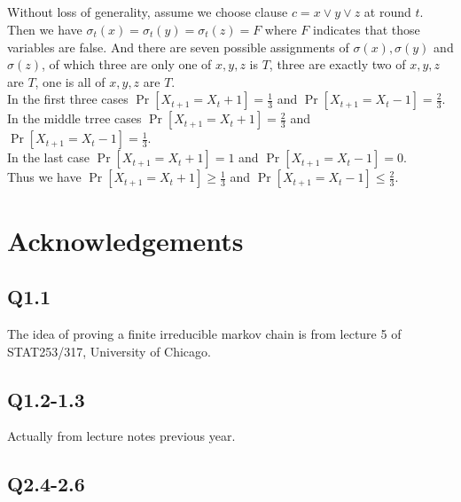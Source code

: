 \documentclass[12pt,letterpaper]{article}
\begin{document}
\subsection{}
Without loss of generality, assume we choose clause $c=x\vee y\vee z$ at round $t$.
Then we have $\sigma_t(x)=\sigma_t(y)=\sigma_t(z)=F$ where $F$ indicates that those variables are false.
And there are seven possible assignments of $\sigma(x),\sigma(y)$ and $\sigma(z)$,
of which three are only one of $x,y,z$ is $T$,
three are exactly two of $x,y,z$ are $T$,
one is all of $x,y,z$ are $T$.\\
In the first three cases $\Pr\left[X_{t+1}=X_{t}+1\right]=\frac{1}{3}$ and $\Pr\left[X_{t+1}=X_{t}-1\right]=\frac{2}{3}$.\\
In the middle trree cases  $\Pr\left[X_{t+1}=X_{t}+1\right]=\frac{2}{3}$ and $\Pr\left[X_{t+1}=X_{t}-1\right]=\frac{1}{3}$.\\
In the last case $\Pr\left[X_{t+1}=X_{t}+1\right]=1$ and $\Pr\left[X_{t+1}=X_{t}-1\right]=0$.\\
Thus we have $\Pr\left[X_{t+1}=X_{t}+1\right]\geq \frac{1}{3}$ and $\Pr\left[X_{t+1}=X_{t}-1\right]\leq\frac{2}{3}$.\\
\newpage
\section{Acknowledgements}
\subsection*{Q1.1}
The idea of proving a finite irreducible markov chain is from lecture 5 of STAT253/317, University of Chicago.
\subsection*{Q1.2-1.3}
Actually from lecture notes previous year.
\subsection*{Q2.4-2.6}
\end{document}
